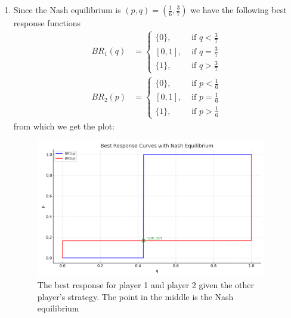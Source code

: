 \documentclass[a4paper]{article}
\begin{document}
\begin{exercise}{3}
\begin{enumerate}[label=(\alph*)]
\begin{enumerate}[label=(\roman*)]
        \item Since the Nash equilibrium is $ (p, q) = \left( \frac{1}{6}, \frac{3}{7} \right) $ we have the following best response functions
          \begin{align*}
            BR_1(q) &=
            \begin{cases}
              \{0\}, &\text{ if } q < \frac{3}{7}\\
              [0, 1], &\text{ if } q = \frac{3}{7}\\
              \{1\}, &\text{ if } q > \frac{3}{7}
            \end{cases} \\
            BR_2(p) &=
            \begin{cases}
              \{0\}, &\text{ if } p < \frac{1}{6}\\
              [0, 1], &\text{ if } p = \frac{1}{6} \\
              \{1\}, &\text{ if } p > \frac{1}{6}
            \end{cases}
          \end{align*}
          from which we get the plot:
          \begin{figure}[H]
            \begin{center}
              \includegraphics[width=0.95\textwidth]{./figures/best_response_curves2.png}
            \end{center}
            \caption{The best response for player 1 and player 2 given the other player's strategy. The point in the middle is the Nash equilibrium}\label{fig:resp2}
          \end{figure}

      \end{enumerate}
  \end{enumerate}
\end{exercise}
\end{document}
